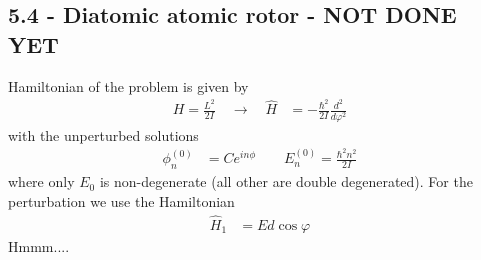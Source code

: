 \documentclass[../main.tex]{subfiles}
\begin{document}
\subsection{5.4 - Diatomic atomic rotor - NOT DONE YET}
Hamiltonian of the problem is given by
\begin{align}
H=\frac{L^2}{2I}\quad\rightarrow\quad\hat{H}&=-\frac{\hbar^2}{2I}\frac{d^2}{d\varphi^2}
\end{align}
with the unperturbed solutions
\begin{align}
\phi_n^{(0)}&=C e^{in\phi}\qquad E_n^{(0)}=\frac{\hbar^2n^2}{2I}
\end{align}
where only $E_0$  is non-degenerate (all other are double degenerated). 
For the perturbation we use the Hamiltonian
\begin{align}
\hat{H}_1&=Ed\cos\varphi
\end{align}
Hmmm....
\end{document}

